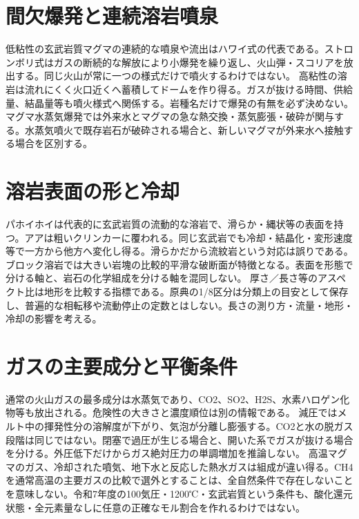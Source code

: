 \section{間欠爆発と連続溶岩噴泉}\label{theory:volcano:styles}
低粘性の玄武岩質マグマの連続的な噴泉や流出はハワイ式の代表である。ストロンボリ式はガスの断続的な解放により小爆発を繰り返し、火山弾・スコリアを放出する\cite{jma_magma1999,vol50_styles_ref}。同じ火山が常に一つの様式だけで噴火するわけではない。
高粘性の溶岩は流れにくく火口近くへ蓄積してドームを作り得る。ガスが抜ける時間、供給量、結晶量等も噴火様式へ関係する。岩種名だけで爆発の有無を必ず決めない。
マグマ水蒸気爆発では外来水とマグマの急な熱交換・蒸気膨張・破砕が関与する。水蒸気噴火で既存岩石が破砕される場合と、新しいマグマが外来水へ接触する場合を区別する。

\section{溶岩表面の形と冷却}\label{theory:volcano:lava}
パホイホイは代表的に玄武岩質の流動的な溶岩で、滑らか・縄状等の表面を持つ。アアは粗いクリンカーに覆われる。同じ玄武岩でも冷却・結晶化・変形速度等で一方から他方へ変化し得る\cite{vol50_lava_ref}。滑らかだから流紋岩という対応は誤りである。
ブロック溶岩では大きい岩塊の比較的平滑な破断面が特徴となる。表面を形態で分ける軸と、岩石の化学組成を分ける軸を混同しない。
厚さ／長さ等のアスペクト比は地形を比較する指標である。原典の1/8区分は分類上の目安として保存し、普遍的な相転移や流動停止の定数とはしない。長さの測り方・流量・地形・冷却の影響を考える。

\section{ガスの主要成分と平衡条件}\label{theory:volcano:gases}
通常の火山ガスの最多成分は水蒸気であり、CO2、SO2、H2S、水素ハロゲン化物等も放出される\cite{vol50_gas_ref}。危険性の大きさと濃度順位は別の情報である。
減圧ではメルト中の揮発性分の溶解度が下がり、気泡が分離し膨張する。CO2と水の脱ガス段階は同じではない\cite{vol50_degassing_ref}。閉塞で過圧が生じる場合と、開いた系でガスが抜ける場合を分ける。外圧低下だけからガス絶対圧力の単調増加を推論しない。
高温マグマのガス、冷却された噴気、地下水と反応した熱水ガスは組成が違い得る。CH4を通常高温の主要ガスの比較で選外とすることは、全自然条件で存在しないことを意味しない。令和7年度の100気圧・1200℃・玄武岩質という条件も、酸化還元状態・全元素量なしに任意の正確なモル割合を作れるわけではない。

